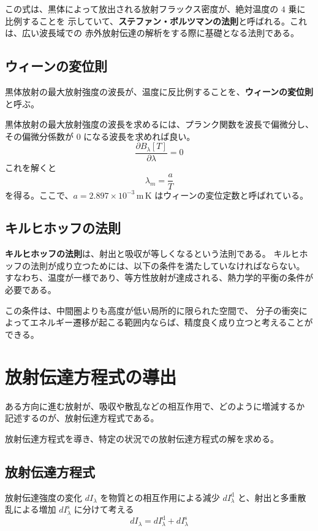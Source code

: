 \documentclass[article]{dennou777}
\newcommand{\Unit}[1]{\,\mathrm{#1}}
\newcommand{\hmemph}[1]{\textbf{#1}}
\begin{document}
この式は、黒体によって放出される放射フラックス密度が、絶対温度の $4$ 乗に比例することを
示していて、\hmemph{ステファン・ボルツマンの法則}と呼ばれる。これは、広い波長域での
赤外放射伝達の解析をする際に基礎となる法則である。

\subsection{ウィーンの変位則}
黒体放射の最大放射強度の波長が、温度に反比例することを、\hmemph{ウィーンの変位則}と呼ぶ。

黒体放射の最大放射強度の波長を求めるには、プランク関数を波長で偏微分し、その偏微分係数が
$0$ になる波長を求めれば良い。
\begin{equation}
	\frac{\partial B_\lambda[T]}{\partial\lambda}=0
\end{equation}
これを解くと
\begin{equation}
	\lambda_m=\frac{a}{T}
\end{equation}
を得る。ここで、$a=2.897\times10^{-3}\Unit{m\,K}$ はウィーンの変位定数と呼ばれている。

\subsection{キルヒホッフの法則}
\hmemph{キルヒホッフの法則}は、射出と吸収が等しくなるという法則である。
キルヒホッフの法則が成り立つためには、以下の条件を満たしていなければならない。
すなわち、温度が一様であり、等方性放射が達成される、熱力学的平衡の条件が必要である。

この条件は、中間圏よりも高度が低い局所的に限られた空間で、
分子の衝突によってエネルギー遷移が起こる範囲内ならば、精度良く成り立つと考えることができる。

\section{放射伝達方程式の導出}
ある方向に進む放射が、吸収や散乱などの相互作用で、どのように増減するか
記述するのが、放射伝達方程式である。

放射伝達方程式を導き、特定の状況での放射伝達方程式の解を求める。

\subsection{放射伝達方程式}
放射伝達強度の変化 $dI_\lambda$ を物質との相互作用による減少
$dI_\lambda^\mathrm{d}$ と、射出と多重散乱による増加
$dI_\lambda^\mathrm{s}$ に分けて考える
\begin{equation}
	dI_\lambda=dI_\lambda^\mathrm{d}+dI_\lambda^\mathrm{s}
\end{equation}
\end{document}

